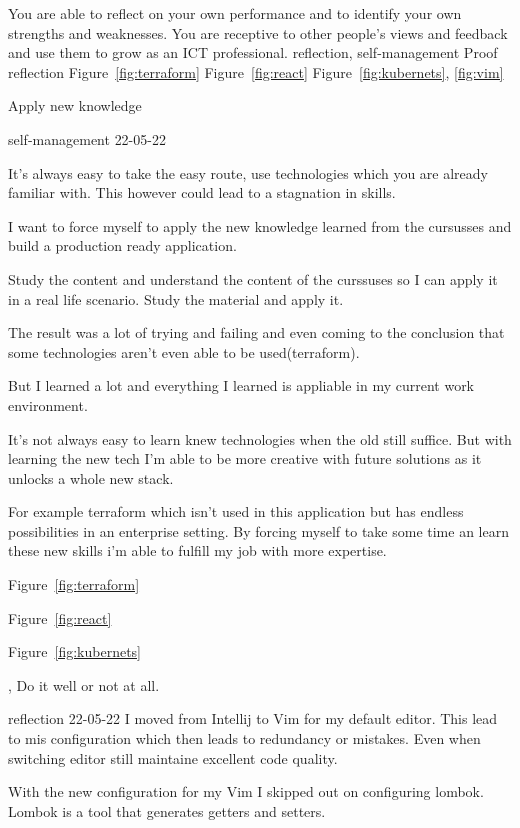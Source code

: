 \competentie
{%
	\competentieformulier
	{%
		You are able to reflect on your own performance and to identify your own strengths and weaknesses. You are receptive to other people's views and feedback and use them to grow as an ICT professional.
	}
	{%
		reflection,%
		self-management%
	}
	{%
		Proof
	}
	{%
		reflection
	}
	{%
		Figure~\ref{fig:terraform}
		Figure~\ref{fig:react}
		Figure~\ref{fig:kubernets},
		\ref{fig:vim}
	}
}
{%
	\bewijs
	{
		Apply new knowledge
	}
	{%
		\starr
		{%
			self-management
		}
		{%
			22-05-22
		}
		{%
			It's always easy to take the easy route, use technologies which you are already familiar with.
			This however could lead to a stagnation in skills.

			I want to force myself to apply the new knowledge learned from the cursusses and build a production ready application.
		}
		{%
			Study the content and understand the content of the curssuses so I can apply it in a real life scenario.
		}
		{%
			Study the material and apply it.
		}
		{%
			The result was a lot of trying and failing and even coming to the conclusion that some technologies aren't even able to be used(terraform).

			But I learned a lot and everything I learned is appliable in my current work environment.

		}
		{%
			It's not always easy to learn knew technologies when the old still suffice.
			But with learning the new tech I'm able to be more creative with future solutions as it unlocks a whole new stack.

			For example terraform which isn't used in this application but has endless possibilities in an enterprise setting.
			By forcing myself to take some time an learn these new skills i'm able to fulfill my job with more expertise.
		}
		{

		}
	}
	{%

		Figure~\ref{fig:terraform}

		Figure~\ref{fig:react}

		Figure~\ref{fig:kubernets}
	},
	\bewijs
	{
		Do it well or not at all.
	}
	{%
		\starr
		{%
			reflection
		}
		{%
			22-05-22
		}
		{%
			I moved from Intellij to Vim for my default editor.
			This lead to mis configuration which then leads to redundancy or mistakes.
		}
		{%
			Even when switching editor still maintaine excellent code quality.
		}
		{%
			With the new configuration for my Vim I skipped out on configuring lombok.
			Lombok is a tool that generates getters and setters.


}}}
